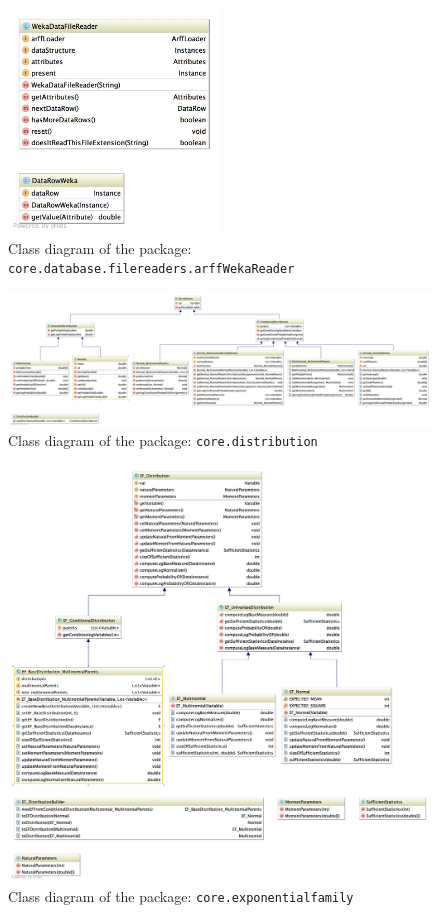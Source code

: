 \begin{figure}[h!]
  \caption{Class diagram of the package: \texttt{core.database.filereaders.arffWekaReader}}
  \centering
    \includegraphics[width=0.5\textwidth]{ClassDiagrams/core_database_filereaders_arffwekareader.jpg}
\end{figure}


\begin{figure}[h!]
  \caption{Class diagram of the package: \texttt{core.distribution}}
  \centering
    \includegraphics[width=\textwidth]{ClassDiagrams/core_distribution.jpg}
\end{figure}

\begin{figure}[h!]
  \caption{Class diagram of the package: \texttt{core.exponentialfamily}}
  \centering
    \includegraphics[width=\textwidth]{ClassDiagrams/core_exponentialfamily.jpg}
\end{figure}


